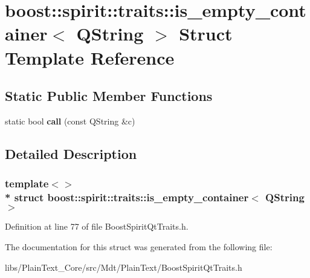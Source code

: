 \hypertarget{structboost_1_1spirit_1_1traits_1_1is__empty__container_3_01_q_string_01_4}{}\section{boost\+:\+:spirit\+:\+:traits\+:\+:is\+\_\+empty\+\_\+container$<$ Q\+String $>$ Struct Template Reference}
\label{structboost_1_1spirit_1_1traits_1_1is__empty__container_3_01_q_string_01_4}
\subsection*{Static Public Member Functions}
\begin{DoxyCompactItemize}
\item 
static bool {\bfseries call} (const Q\+String \&c)\hypertarget{structboost_1_1spirit_1_1traits_1_1is__empty__container_3_01_q_string_01_4_a4d448a7b6e4c67f8f7f719818868b78f}{}\label{structboost_1_1spirit_1_1traits_1_1is__empty__container_3_01_q_string_01_4_a4d448a7b6e4c67f8f7f719818868b78f}

\end{DoxyCompactItemize}


\subsection{Detailed Description}
\subsubsection*{template$<$$>$\\*
struct boost\+::spirit\+::traits\+::is\+\_\+empty\+\_\+container$<$ Q\+String $>$}



Definition at line 77 of file Boost\+Spirit\+Qt\+Traits.\+h.



The documentation for this struct was generated from the following file\+:\begin{DoxyCompactItemize}
\item 
libs/\+Plain\+Text\+\_\+\+Core/src/\+Mdt/\+Plain\+Text/Boost\+Spirit\+Qt\+Traits.\+h\end{DoxyCompactItemize}
